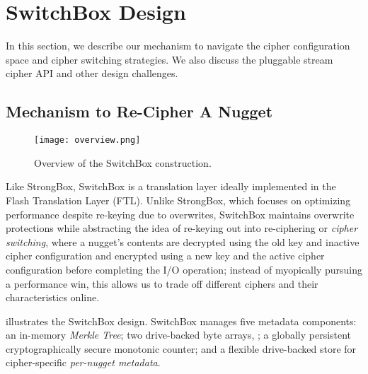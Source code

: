 \section{SwitchBox Design}\label{sec:design}


In this section, we describe our mechanism to navigate the cipher configuration
space and cipher switching strategies. We also discuss the pluggable stream
cipher API and other design challenges.


\subsection{Mechanism to Re-Cipher A Nugget}

\begin{figure}[t]
   \centering
   \texttt{[image: overview.png]}
   \caption{Overview of the SwitchBox construction.}\label{fig:overview}
\end{figure}

Like StrongBox, SwitchBox is a translation layer ideally implemented in the
Flash Translation Layer (FTL). Unlike StrongBox, which focuses on optimizing
performance despite re-keying due to overwrites, SwitchBox maintains overwrite
protections while abstracting the idea of re-keying out into re-ciphering or
\emph{cipher switching}, where a nugget's contents are decrypted using the old
key and inactive cipher configuration and encrypted using a new key and the
active cipher configuration before completing the I/O operation; instead of
myopically pursuing a performance win, this allows us to trade off different
ciphers and their characteristics online.

 illustrates the SwitchBox design. SwitchBox manages five
metadata components: an in-memory \emph{Merkle Tree}; two drive-backed byte
arrays, ; a
globally persistent cryptographically secure monotonic counter; and a flexible
drive-backed store for cipher-specific \emph{per-nugget metadata}.

